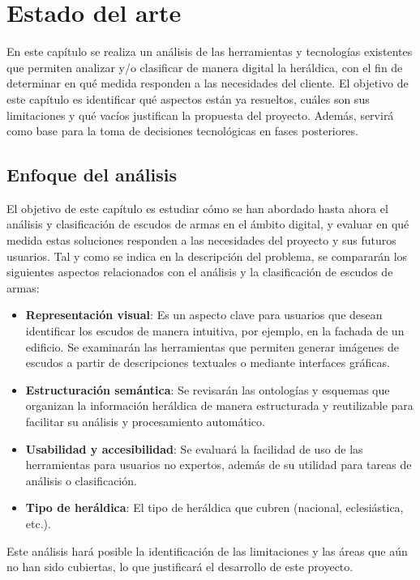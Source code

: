 \chapter{Estado del arte}

En este capítulo se realiza un análisis de las herramientas y tecnologías
existentes que permiten analizar y/o clasificar de manera digital la heráldica, con el fin
de determinar en qué medida responden a las necesidades del cliente.
El objetivo de este capítulo es identificar qué aspectos están ya resueltos,
cuáles son sus limitaciones y qué vacíos justifican la propuesta del proyecto.
Además, servirá como base para la toma de decisiones tecnológicas en fases posteriores.

\section{Enfoque del análisis}
El objetivo de este capítulo es estudiar cómo se han abordado hasta ahora el análisis y
clasificación de escudos de armas en el ámbito digital, y evaluar en qué medida estas soluciones 
responden a las necesidades del proyecto y sus futuros usuarios.
Tal y como se indica en la descripción del problema, se compararán los siguientes aspectos 
relacionados con el análisis y la clasificación de escudos de armas:

\begin{itemize}
    \item \textbf{Representación visual}: Es un aspecto clave para usuarios que desean identificar
    los escudos de manera intuitiva, por ejemplo, en la fachada de un edificio. Se examinarán las 
    herramientas que permiten generar imágenes de escudos a partir de descripciones textuales o 
    mediante interfaces gráficas.
    \item \textbf{Estructuración semántica}: Se revisarán las ontologías y esquemas que
    organizan la información heráldica de manera estructurada y reutilizable para facilitar
    su análisis y procesamiento automático.
    \item \textbf{Usabilidad y accesibilidad}: Se evaluará la facilidad de uso de las herramientas
    para usuarios no expertos, además de su utilidad para tareas de análisis o clasificación.
    \item \textbf{Tipo de heráldica}: El tipo de heráldica que cubren (nacional, eclesiástica, etc.).
\end{itemize}

Este análisis hará posible la identificación de las limitaciones y las áreas que aún no han sido
cubiertas, lo que justificará el desarrollo de este proyecto.

